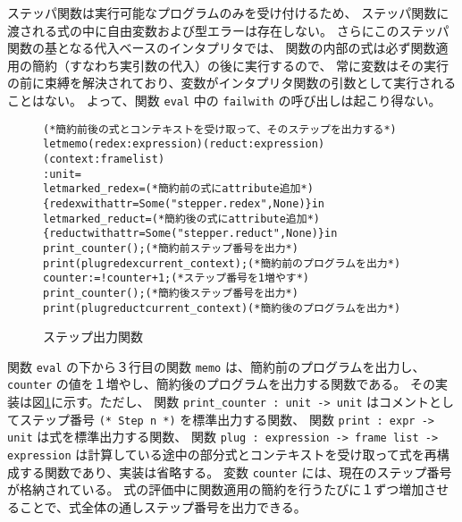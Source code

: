 ステッパ関数は実行可能なプログラムのみを受け付けるため、
ステッパ関数に渡される式の中に自由変数および型エラーは存在しない。
さらにこのステッパ関数の基となる代入ベースのインタプリタでは、
関数の内部の式は必ず関数適用の簡約（すなわち実引数の代入）の後に実行するので、
常に変数はその実行の前に束縛を解決されており、変数がインタプリタ関数の引数として実行されることはない。
よって、関数 \texttt{eval} 中の \texttt{failwith} の呼び出しは起こり得ない。

\begin{figure}[t]
\begin{spacing}{0.8}
\begin{alltt}
(* 簡約前後の式とコンテキストを受け取って、そのステップを出力する *)
let memo (redex : expression) (reduct : expression) (context : frame list)
  : unit =
  let marked_redex =                            (* 簡約前の式に attribute 追加 *)
    \{redex with attr = Some ("stepper.redex", None)\} in
  let marked_reduct =                           (* 簡約後の式に attribute 追加 *)
    \{reduct with attr = Some ("stepper.reduct", None)\} in
  print_counter ();                                 (* 簡約前ステップ番号を出力 *)
  print (plug redex current_context);               (* 簡約前のプログラムを出力 *)
  counter := !counter + 1;                          (* ステップ番号を 1 増やす *)
  print_counter ();                                 (* 簡約後ステップ番号を出力 *)
  print (plug reduct current_context)               (* 簡約後のプログラムを出力 *)
\end{alltt}
\end{spacing}
\caption{ステップ出力関数}
\label{figure:memo}
\end{figure}

関数 \texttt{eval} の下から３行目の関数 \texttt{memo} は、簡約前のプログラムを出力し、
\texttt{counter} の値を１増やし、簡約後のプログラムを出力する関数である。
その実装は図\ref{figure:memo}に示す。ただし、
関数 \texttt{print\_counter :\ unit -> unit} はコメントとしてステップ番号
\texttt{(* Step n *)} を標準出力する関数、
関数 \texttt{print :\ expr -> unit} は式を標準出力する関数、
関数 \texttt{plug :\ expression -> frame list -> expression}
は計算している途中の部分式とコンテキストを受け取って式を再構成する関数であり、実装は省略する。
変数 \texttt{counter} には、現在のステップ番号が格納されている。
式の評価中に関数適用の簡約を行うたびに１ずつ増加させることで、式全体の通しステップ番号を出力できる。
